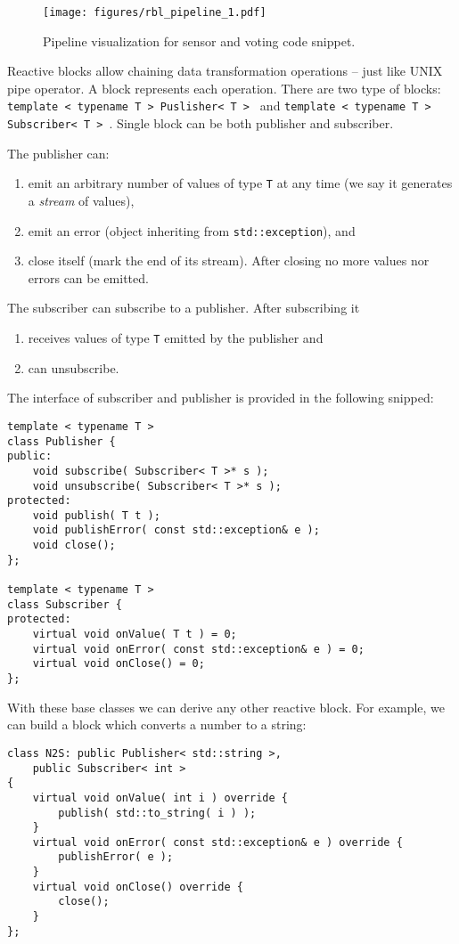\begin{figure}[!t]
    \centering
    \texttt{[image: figures/rbl\_pipeline\_1.pdf]}
    \caption{Pipeline visualization for sensor and voting code snippet.}
    \label{fig:rbl_example_1}
\end{figure}

Reactive blocks allow chaining data transformation operations -- just like UNIX
pipe operator. A block represents each operation. There are two type of blocks:
\texttt{template < typename T > Puslisher< T > } and
\texttt{template < typename T > Subscriber< T > }. Single
block can be both publisher and subscriber.

\noindent The publisher can:
\begin{enumerate}
    \item emit an arbitrary number of values of type \texttt{T} at any time (we
    say it generates a \emph{stream} of values),
    \item emit an error (object inheriting from
    \texttt{std::exception}), and
    \item close itself (mark the end of its stream). After closing no more
    values nor errors can be emitted.
\end{enumerate}

\noindent The subscriber can subscribe to a publisher. After subscribing it
\begin{enumerate}
    \item receives values of type \texttt{T} emitted by the publisher and
    \item can unsubscribe.
\end{enumerate}

The interface of subscriber and publisher is provided in the
following snipped:
\begin{verbatim}
template < typename T >
class Publisher {
public:
    void subscribe( Subscriber< T >* s );
    void unsubscribe( Subscriber< T >* s );
protected:
    void publish( T t );
    void publishError( const std::exception& e );
    void close();
};

template < typename T >
class Subscriber {
protected:
    virtual void onValue( T t ) = 0;
    virtual void onError( const std::exception& e ) = 0;
    virtual void onClose() = 0;
};
\end{verbatim}

With these base classes we can derive any other reactive block. For example, we
can build a block which converts a number to a string:
\begin{verbatim}
class N2S: public Publisher< std::string >,
    public Subscriber< int >
{
    virtual void onValue( int i ) override {
        publish( std::to_string( i ) );
    }
    virtual void onError( const std::exception& e ) override {
        publishError( e );
    }
    virtual void onClose() override {
        close();
    }
};
\end{verbatim}

